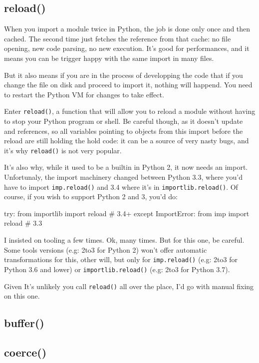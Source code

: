\subsection{reload()}

When you import a module twice in Python, the job is done only once and then cached. The second time just fetches the reference from that cache: no file opening, new code parsing, no new execution. It's good for performances, and it means you can be trigger happy with the same import in many files.

But it also means if you are in the process of developping the code that if you change the file on disk and proceed to import it, nothing will happend. You need to restart the Python VM for changes to take effect.

Enter \lstinline{reload()}, a function that will allow you to reload a module without having to stop your Python program or shell. Be careful though, as it doesn't update and references, so all variables pointing to objects from this import before the reload are still holding the hold code: it can be a source of very nasty bugs, and it's why \lstinline{reload()} is not very popular.

It's also why, while it used to be a builtin in Python 2, it now needs an import. Unfortunaly, the import machinery changed between Python 3.3, where you'd have to import \lstinline{imp.reload()} and 3.4 where it's in \lstinline{importlib.reload()}. Of course, if you wish to support Python 2 and 3, you'd do:

\begin{py2and3}
try:
    from importlib import reload # 3.4+
except ImportError:
    from imp import reload # 3.3
\end{py2and3}

I insisted on tooling a few times. Ok, many times. But for this one, be careful. Some tools versions (e.g: 2to3 for Python 2) won't offer automatic transformations for this, other will, but only for \lstinline{imp.reload()} (e.g: 2to3 for Python 3.6 and lower) or \lstinline{importlib.reload()} (e.g: 2to3 for Python 3.7).

Given It's unlikely you call \lstinline{reload()} all over the place, I'd go with manual fixing on this one.

\subsection{buffer()}

\subsection{coerce()}

